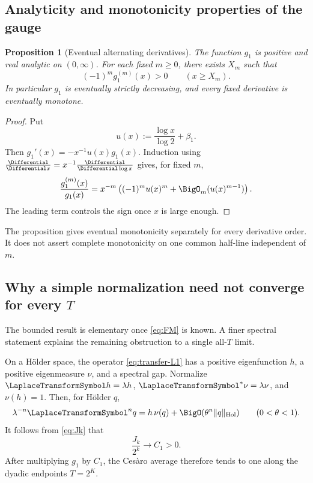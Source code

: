 \documentclass[11pt,oneside]{article}
\newtheorem{proposition}[theorem]{Proposition}
\theoremstyle{definition}
\theoremstyle{remark}
\begin{document}
\subsection{Analyticity and monotonicity properties of the gauge}

\begin{proposition}[Eventual alternating derivatives]\label{prop:g-derivatives}
The function $g_1$ is positive and real analytic on $(0,\infty)$.  For each fixed
$m\ge0$, there exists $X_m$ such that
\begin{equation}\label{eq:derivative-sign}
 (-1)^m g_1^{(m)}(x)>0\qquad(x\ge X_m).
\end{equation}
In particular $g_1$ is eventually strictly decreasing, and every fixed derivative is
eventually monotone.
\end{proposition}

\begin{proof}
Put
\[
 u(x):=\frac{\log x}{\log2}+\beta_1.
\]
Then $g_1'(x)=-x^{-1}u(x)g_1(x)$.  Induction using
$\frac{\Differential}{\Differential x}=x^{-1}\frac{\Differential}{\Differential\log x}$ gives, for fixed $m$,
\begin{equation}\label{eq:derivative-asymp}
 \frac{g_1^{(m)}(x)}{g_1(x)}
 =x^{-m}\left((-1)^m u(x)^m+\BigO_m(u(x)^{m-1})\right).
\end{equation}
The leading term controls the sign once $x$ is large enough.
\end{proof}

The proposition gives eventual monotonicity separately for every derivative order.  It
does not assert complete monotonicity on one common half-line independent of $m$.

\subsection{Why a simple normalization need not converge for every \texorpdfstring{$T$}{T}}

The bounded result is elementary once \eqref{eq:FM} is known.  A finer spectral
statement explains the remaining obstruction to a single all-$T$ limit.

On a H\"older space, the operator \eqref{eq:transfer-L1} has a positive eigenfunction
$h$, a positive eigenmeasure $\nu$, and a spectral gap.  Normalize
$\LaplaceTransformSymbol h=\lambda h$, $\LaplaceTransformSymbol^*\nu=\lambda\nu$, and $\nu(h)=1$.  Then, for H\"older $q$,
\begin{equation}\label{eq:spectral-gap}
 \lambda^{-n}\LaplaceTransformSymbol^nq
 =h\,\nu(q)+\BigO(\theta^n\|q\|_{\mathrm{Hol}})
 \qquad(0<\theta<1).
\end{equation}
It follows from \eqref{eq:Jk} that
\begin{equation}\label{eq:Jk-limit}
 \frac{J_k}{2^k}\longrightarrow C_1>0.
\end{equation}
After multiplying $g_1$ by $C_1$, the Ces\`aro average therefore tends to one along the
dyadic endpoints $T=2^K$.
\end{document}
